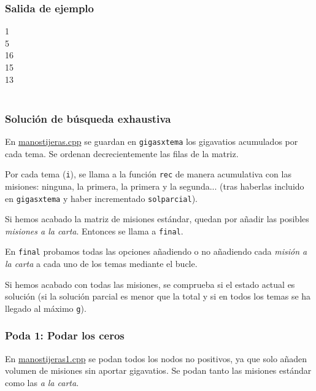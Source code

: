\documentclass{article}
\newenvironment{caja}{
	\begingroup
	\ttfamily\noindent
	\tabularx{\linewidth}{|X|}\hline
}
{
	\hline\endtabularx
	\normalfont
	\endgroup
}
\begin{document}
	\subsubsection*{Salida de ejemplo}
	\begin{caja}
		1\\
		5\\
		16\\
		15\\
		13\\
	\end{caja}\\

	\newpage
	
	\tableofcontents
	
	\newpage
	
	\subsubsection*{Solución de búsqueda exhaustiva}
	En \href{run:manostijeras.cpp}{manostijeras.cpp} se guardan en \texttt{gigasxtema} los gigavatios acumulados por cada tema. Se ordenan decrecientemente las filas de la matriz.
	
	Por cada tema (\texttt{i}), se llama a la función \texttt{rec} de manera acumulativa con las misiones: ninguna, la primera, la primera y la segunda... (tras haberlas incluido en \texttt{gigasxtema} y haber incrementado \texttt{solparcial}).
	
	Si hemos acabado la matriz de misiones estándar, quedan por añadir las posibles \textit{misiones a la carta}. Entonces se llama a \texttt{final}.

	En \texttt{final} probamos todas las opciones añadiendo o no añadiendo cada \textit{misión a la carta} a cada uno de los temas mediante el bucle.
	
	Si hemos acabado con todas las misiones, se comprueba si el estado actual es solución (si la solución parcial es menor que la total y si en todos los temas se ha llegado al máximo \texttt{g}).\\
	
	\subsubsection*{Poda 1: Podar los ceros}
	En \href{run:manostijeras1.cpp}{manostijeras1.cpp} se podan todos los nodos no positivos, ya que solo añaden volumen de misiones sin aportar gigavatios. Se podan tanto las misiones estándar como las \textit{a la carta}.\\
	
\end{document}
